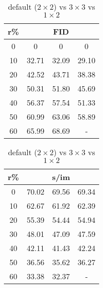 \begin{table}[htp]
\caption{default ($2 \times 2$) vs $3 \times 3$ vs $1 \times 2$}
    \begin{minipage}{0.48\textwidth}
        \centering
        \begin{tabular}{|c||c|c|c|}
            \hline
            \multicolumn{1}{|c||}{r\%} & \multicolumn{3}{c|}{FID}\\
            \hline
            0 & 0 & 0 & 0 \\
            10 & 32.71 & 32.09 & 29.10 \\
            20 & 42.52 & 43.71 & 38.38 \\
            30 & 50.31 & 51.80 & 45.69 \\
            40 & 56.37 & 57.54 & 51.33 \\
            50 & 60.99 & 63.06 & 58.89 \\
            60 & 65.99 & 68.69 & - \\
            \hline
        \end{tabular}
    \end{minipage}
    \hfill
    \begin{minipage}{0.48\textwidth}
        \centering
        \begin{tabular}{|c||c|c|c|}
            \hline
            \multicolumn{1}{|c||}{r\%} & \multicolumn{3}{c|}{s/im}\\
            \hline
            0 & 70.02 & 69.56 & 69.34 \\
            10 & 62.67 & 61.92 & 62.39 \\
            20 & 55.39 & 54.44 & 54.94 \\
            30 & 48.01 & 47.09 & 47.59 \\
            40 & 42.11 & 41.43 & 42.24 \\
            50 & 36.56 & 35.62 & 36.27 \\
            60 & 33.38 & 32.37 & - \\
            \hline
        \end{tabular}
    \end{minipage}
\end{table}